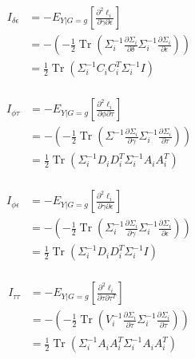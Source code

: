 \documentclass[hidelinks]{article}
\DeclareMathOperator{\Tr}{Tr}
\begin{document}
\begingroup
\large
\begin{equation}
\begin{split}
I_{\delta\epsilon} &= - E_{Y|G=g}\left[ \frac{\partial^2 \ell_i }{\partial \gamma \partial \epsilon}\right]\\
&= - \left(-\frac{1}{2} \Tr\left(\Sigma_i^{-1}\frac{\partial \Sigma_i }{\partial \delta} \Sigma_i^{-1}\frac{\partial \Sigma_i }{\partial \epsilon} \right) \right)\\
&= \frac{1}{2} \Tr \left(\Sigma_i^{-1} C_i C_i^T \Sigma_i^{-1}I \right)\\
\end{split}
\end{equation}
\endgroup

\begingroup
\large
\begin{equation*}
\begin{split}
I_{\phi\tau} &= - E_{Y|G=g}\left[ \frac{\partial^2 \ell_i }{\partial \phi \partial \tau}\right]\\
&= - \left(-\frac{1}{2} \Tr\left(\Sigma^{-1}\frac{\partial \Sigma_i }{\partial \gamma} \Sigma_i^{-1}\frac{\partial \Sigma_i }{\partial \tau} \right) \right)\\
&= \frac{1}{2} \Tr \left(\Sigma_i^{-1} D_i D_i^T \Sigma_i^{-1} A_i A_i^T \right)\\
\end{split}
\end{equation*}
\endgroup

\begingroup
\large
\begin{equation}
\begin{split}
I_{\phi\epsilon} &= - E_{Y|G=g}\left[ \frac{\partial^2 \ell_i }{\partial \gamma \partial \epsilon}\right]\\
&= - \left(-\frac{1}{2} \Tr\left(\Sigma_i^{-1}\frac{\partial \Sigma_i }{\partial \gamma} \Sigma_i^{-1}\frac{\partial \Sigma_i }{\partial \epsilon} \right) \right)\\
&= \frac{1}{2} \Tr \left(\Sigma_i^{-1} D_i D_i^T \Sigma_i^{-1}I \right)\\
\end{split}
\end{equation}
\endgroup

\begingroup
\large
\begin{equation}
\begin{split}
I_{\tau\tau} &= - E_{Y|G=g}\left[ \frac{\partial^2 \ell_i }{\partial \tau \partial \tau^T}\right]\\
&= - \left(-\frac{1}{2} \Tr\left(V_i^{-1}\frac{\partial \Sigma_i }{\partial \tau} \Sigma_i^{-1}\frac{\partial \Sigma_i }{\partial \tau} \right) \right)\\
&= \frac{1}{2} \Tr \left(\Sigma_i^{-1} A_i A_i^T \Sigma_i^{-1} A_i A_i^T\right)\\
\end{split}
\end{equation}
\endgroup
\end{document}
